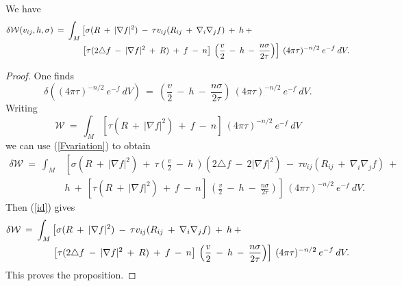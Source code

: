 \begin{proposition}
  \label{prop:kl-w-entropy-first-variation-w-entropy}

We have
\begin{align}
\delta {\mathcal W}(v_{ij}, h, \sigma) \: = \:
\int_M & \left[ \sigma  (R \: + \: |\nabla f|^2) \:
- \: \tau v_{ij} (R_{ij} \: + \: \nabla_i \nabla_j f) \: + \: h \: +
\right.  \\
& \left.
\left[ \tau (2 \triangle f \: - \: |\nabla f|^2 \: + \: R) \: + \: f
\: - \: n \right] \:
\left( \frac{v}{2} \: - \: h \: - \: \frac{n\sigma}{2\tau} \right) \right] \:
(4 \pi \tau)^{-n/2} \: e^{-f} \: dV. \notag
\end{align}
\end{proposition}
\begin{proof}
One finds
\begin{equation}
\delta \left( (4 \pi \tau)^{-n/2} \: e^{-f} \: dV \right) \: = \:
\left( \frac{v}{2} \: - \: h \: - \: \frac{n\sigma}{2\tau} \right) \:
(4 \pi \tau)^{-n/2} \: e^{-f} \: dV.
\end{equation}
Writing
\begin{equation}
{\mathcal W} \: = \: \int_M \left[ \tau (R \: + \: |\nabla f|^2) \: + \: f
\: - \: n \right] \: (4 \pi \tau)^{-n/2} \: e^{-f} \: dV
\end{equation}
we can use
(\ref{Fvariation}) to obtain
\begin{align}
\delta {\mathcal W} \: = \:
\int_M & \left[ \sigma  (R \: + \: |\nabla f|^2) \: + \:
\tau  \left( \frac{v}{2} \:  - \: h \: \right) (2 \triangle f \: - \:
2|\nabla f|^2) \: - \: \tau v_{ij} (R_{ij} \: + \: \nabla_i \nabla_j f) \: +
\right. \\
& \left. h \: + \:
\left[ \tau (R \: + \: |\nabla f|^2) \: + \: f
\: - \: n \right] \:
\left( \frac{v}{2} \: - \: h \: - \: \frac{n\sigma}{2\tau} \right) \right] \:
(4 \pi \tau)^{-n/2} \: e^{-f} \: dV.
\end{align}
Then (\ref{id}) gives
\begin{align}
\delta {\mathcal W} \:
= \:
\int_M & \left[ \sigma  (R \: + \: |\nabla f|^2) \:
- \: \tau v_{ij} (R_{ij} \: + \: \nabla_i \nabla_j f) \: + \: h \: +
\right. \\
& \left.
\left[ \tau (2 \triangle f \: - \: |\nabla f|^2 \: + \: R) \: + \: f
\: - \: n \right] \:
\left( \frac{v}{2} \: - \: h \: - \: \frac{n\sigma}{2\tau} \right) \right] \:
(4 \pi \tau)^{-n/2} \: e^{-f} \: dV. \notag
\end{align}
This proves the proposition.
\end{proof}

